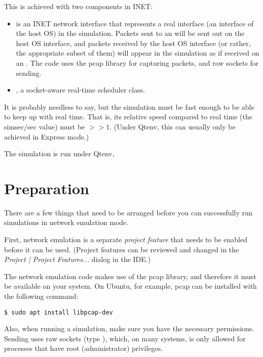 This is achieved with two components in INET:

\begin{itemize}
  \item {} is an INET network interface that represents
    a real interface (an interface of the host OS) in the simulation.
    Packets sent to an  will be sent out on the
    host OS interface, and packets received by the host OS interface
    (or rather, the appropriate subset of them) will appear in the
    simulation as if received on an . The code
    uses the pcap library for capturing packets, and raw sockets for sending.
 \item {}, a socket-aware real-time scheduler class.
\end{itemize}

\begin{note}
It is probably needless to say, but the simulation must be fast enough
to be able to keep up with real time. That is, its relative speed compared
to real time (the simsec/sec value) must be $>>1$.  (Under Qtenv, this
can usually only be achieved in Express mode.)
\end{note}

The simulation is run under Qtenv,

\section{Preparation}
\label{sec:emulation:preparation}

There are a few things that need to be arranged before you can successfully
run simulations in network emulation mode.

First, network emulation is a separate \textit{project feature} that needs to
be enabled before it can be used. (Project features can be reviewed and changed
in the \textit{Project | Project Features...} dialog in the IDE.)

The network emulation code makes use of the pcap library, and therefore
it must be available on your system. On Ubuntu, for example, pcap can be
installed with the following command:

\begin{verbatim}
$ sudo apt install libpcap-dev
\end{verbatim}

Also, when running a simulation, make sure you have the necessary permissions.
Sending uses raw sockets (type ), which, on many systems,
is only allowed for processes that have root (administrator) privileges.


